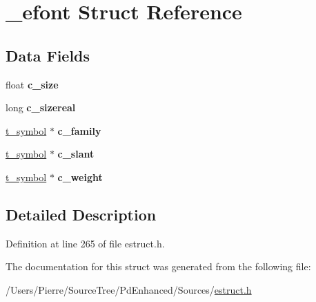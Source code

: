 \hypertarget{struct__efont}{\section{\-\_\-efont Struct Reference}
\label{struct__efont}
}
\subsection*{Data Fields}
\begin{DoxyCompactItemize}
\item 
\hypertarget{struct__efont_a0c2e0d8b2b562976f466b37e1804e896}{float {\bfseries c\-\_\-size}}\label{struct__efont_a0c2e0d8b2b562976f466b37e1804e896}

\item 
\hypertarget{struct__efont_a5067e2808a370660ab2f4b27b52019a5}{long {\bfseries c\-\_\-sizereal}}\label{struct__efont_a5067e2808a370660ab2f4b27b52019a5}

\item 
\hypertarget{struct__efont_ad0a12c28988a03d63f0a63ae52545b7e}{\hyperlink{struct__symbol}{t\-\_\-symbol} $\ast$ {\bfseries c\-\_\-family}}\label{struct__efont_ad0a12c28988a03d63f0a63ae52545b7e}

\item 
\hypertarget{struct__efont_afe59dcb9bf09d16691d63350aba4e22f}{\hyperlink{struct__symbol}{t\-\_\-symbol} $\ast$ {\bfseries c\-\_\-slant}}\label{struct__efont_afe59dcb9bf09d16691d63350aba4e22f}

\item 
\hypertarget{struct__efont_a1e65976e3fc680a945be671bbcada87c}{\hyperlink{struct__symbol}{t\-\_\-symbol} $\ast$ {\bfseries c\-\_\-weight}}\label{struct__efont_a1e65976e3fc680a945be671bbcada87c}

\end{DoxyCompactItemize}


\subsection{Detailed Description}


Definition at line 265 of file estruct.\-h.



The documentation for this struct was generated from the following file\-:\begin{DoxyCompactItemize}
\item 
/\-Users/\-Pierre/\-Source\-Tree/\-Pd\-Enhanced/\-Sources/\hyperlink{estruct_8h}{estruct.\-h}\end{DoxyCompactItemize}

